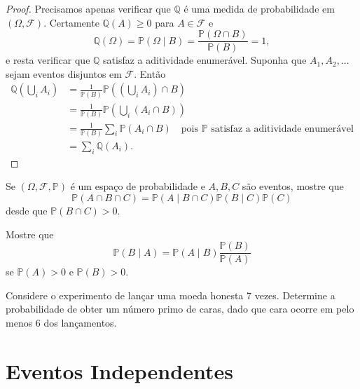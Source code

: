\begin{proof}
  Precisamos apenas verificar que \(\mathbb{Q}\) é uma medida de probabilidade
  em \((\Omega, \mathcal{F})\). Certamente \(\mathbb{Q}(A) \geq 0\) para \(A
  \in \mathcal{F}\) e
  \[
    \mathbb{Q}(\Omega) = \mathbb{P}(\Omega \mid B) =
    \frac{\mathbb{P}(\Omega \cap B)}{\mathbb{P}(B)} = 1,
  \]
  e resta verificar que \(\mathbb{Q}\) satisfaz a aditividade enumerável.
  Suponha que \(A_1, A_2, \ldots\) sejam eventos disjuntos em
  \(\mathcal{F}\). Então
  \[
    \begin{aligned}
      \mathbb{Q}\left(\bigcup_i A_i\right) &= \frac{1}{\mathbb{P}(B)}
      \mathbb{P}\left(\left(\bigcup_i A_i\right) \cap B\right) \\
      &= \frac{1}{\mathbb{P}(B)} \mathbb{P}\left(\bigcup_i (A_i \cap
        B)\right) \\
      &= \frac{1}{\mathbb{P}(B)} \sum_i \mathbb{P}(A_i \cap B) \quad
        \text{pois } \mathbb{P} \text{ satisfaz a aditividade enumerável} \\
      &= \sum_i \mathbb{Q}(A_i).
    \end{aligned}
  \]
\end{proof}

\begin{exercise}\label{gw:exercicio:regra-cadeia}
  Se \((\Omega, \mathcal{F}, \mathbb{P})\) é um espaço de probabilidade e
  \(A, B, C\) são eventos, mostre que
  \[
    \mathbb{P}(A \cap B \cap C) = \mathbb{P}(A \mid B \cap
    C)\mathbb{P}(B \mid C)\mathbb{P}(C)
  \]
  desde que \(\mathbb{P}(B \cap C) > 0\).
\end{exercise}

\begin{exercise}\label{gw:exercicio:bayes-formula}
  Mostre que
  \[
    \mathbb{P}(B \mid A) = \mathbb{P}(A \mid B)
    \frac{\mathbb{P}(B)}{\mathbb{P}(A)}
  \]
  se \(\mathbb{P}(A) > 0\) e \(\mathbb{P}(B) > 0\).
\end{exercise}

\begin{exercise}\label{gw:exercicio:sete-moedas}
  Considere o experimento de lançar uma moeda honesta 7 vezes. Determine a
  probabilidade de obter um número primo de caras, dado que cara ocorre em
  pelo menos 6 dos lançamentos.
\end{exercise}

\section{Eventos Independentes}

